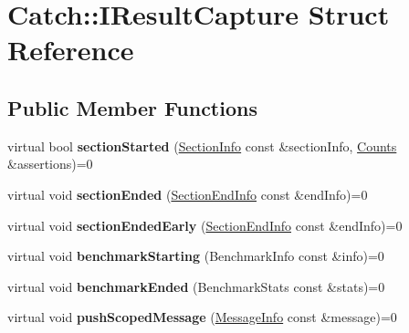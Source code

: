 \hypertarget{struct_catch_1_1_i_result_capture}{}\section{Catch\+:\+:I\+Result\+Capture Struct Reference}
\label{struct_catch_1_1_i_result_capture}
\subsection*{Public Member Functions}
\begin{DoxyCompactItemize}
\item 
\mbox{\label{struct_catch_1_1_i_result_capture_a5b76ed52badcb64cf374202e12b81a03}} 
virtual bool {\bfseries section\+Started} (\mbox{\hyperlink{struct_catch_1_1_section_info}{Section\+Info}} const \&section\+Info, \mbox{\hyperlink{struct_catch_1_1_counts}{Counts}} \&assertions)=0
\item 
\mbox{\label{struct_catch_1_1_i_result_capture_a4e152bc43dc0933684e31fa67a58195d}} 
virtual void {\bfseries section\+Ended} (\mbox{\hyperlink{struct_catch_1_1_section_end_info}{Section\+End\+Info}} const \&end\+Info)=0
\item 
\mbox{\label{struct_catch_1_1_i_result_capture_afcc71eef8ca821ae132cced4a2be6988}} 
virtual void {\bfseries section\+Ended\+Early} (\mbox{\hyperlink{struct_catch_1_1_section_end_info}{Section\+End\+Info}} const \&end\+Info)=0
\item 
\mbox{\label{struct_catch_1_1_i_result_capture_a264ae12330c74b2daae41715a30d51bf}} 
virtual void {\bfseries benchmark\+Starting} (Benchmark\+Info const \&info)=0
\item 
\mbox{\label{struct_catch_1_1_i_result_capture_a6e5e64f9d94211a888249012ab6cc7fb}} 
virtual void {\bfseries benchmark\+Ended} (Benchmark\+Stats const \&stats)=0
\item 
\mbox{\label{struct_catch_1_1_i_result_capture_a91d154c1e087e383dcde5aad95cb6a05}} 
virtual void {\bfseries push\+Scoped\+Message} (\mbox{\hyperlink{struct_catch_1_1_message_info}{Message\+Info}} const \&message)=0

\end{DoxyCompactItemize}
